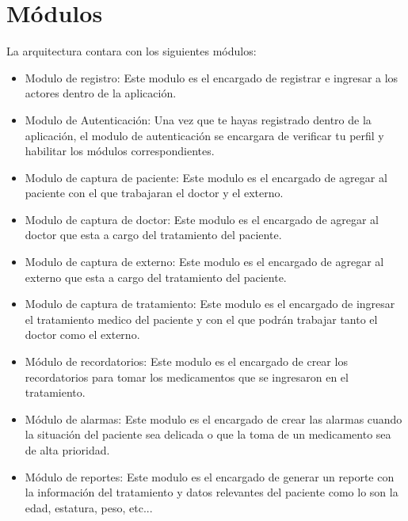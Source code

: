 \section{Módulos}
La arquitectura contara con los siguientes módulos:
\begin{itemize}
	\item Modulo de registro: Este modulo es el encargado de registrar e ingresar a los actores dentro de la aplicación. 
	
	
	\item Modulo de Autenticación: Una vez que te hayas registrado dentro de la aplicación, el modulo de autenticación se encargara de verificar tu perfil y habilitar los módulos correspondientes.
	
	 
	\item Modulo de captura de paciente: Este modulo es el encargado de agregar al paciente con el que trabajaran el doctor y el externo.
	
	\item Modulo de captura de doctor: Este modulo es el encargado de agregar al doctor que esta a cargo del tratamiento del paciente.
	
	\item Modulo de captura de externo: Este modulo es el encargado de agregar al externo que esta a cargo del tratamiento del paciente.
	
	\item Modulo de captura de tratamiento: Este modulo es el encargado de ingresar el tratamiento medico del paciente y con el que podrán trabajar tanto el doctor como el externo. 
	
	\item Módulo de recordatorios: Este modulo es el encargado de crear los recordatorios para tomar los medicamentos que se ingresaron en el tratamiento.
	
	\item Módulo de alarmas: Este modulo es el encargado de crear las alarmas cuando la situación del paciente sea delicada o que la toma de un medicamento sea de alta prioridad.
	
	\item Módulo de reportes: Este modulo es el encargado de generar un reporte con la información del tratamiento y datos relevantes del paciente como lo son la edad, estatura, peso, etc...
	
	
	
	
	

\end{itemize}
